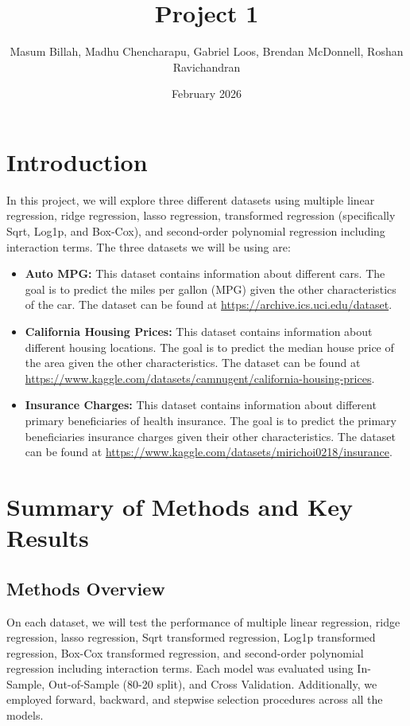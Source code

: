 \documentclass{article}
\title{Project 1}
\author{Masum Billah, Madhu Chencharapu, Gabriel Loos, Brendan McDonnell, Roshan Ravichandran}
\date{February 2026}
\begin{document}
\maketitle

\section{Introduction}

In this project, we will explore three different datasets using multiple linear regression, ridge regression, lasso regression, transformed regression (specifically Sqrt, Log1p, and Box-Cox), and second-order polynomial regression including interaction terms. The three datasets we will be using are:

\begin{itemize}
	\item \textbf{Auto MPG:} This dataset contains information about different cars. The goal is to predict the miles per gallon (MPG) given the other characteristics of the car. The dataset can be found at \url{https://archive.ics.uci.edu/dataset}.
	\item \textbf{California Housing Prices:} This dataset contains information about different housing locations. The goal is to predict the median house price of the area given the other characteristics. The dataset can be found at \url{https://www.kaggle.com/datasets/camnugent/california-housing-prices}.
	\item \textbf{Insurance Charges:} This dataset contains information about different primary beneficiaries of health insurance. The goal is to predict the primary beneficiaries insurance charges given their other characteristics. The dataset can be found at \url{https://www.kaggle.com/datasets/mirichoi0218/insurance}.
\end{itemize}

\section{Summary of Methods and Key Results}

\subsection{Methods Overview}

On each dataset, we will test the performance of multiple linear regression, ridge regression, lasso regression, Sqrt transformed regression, Log1p transformed regression, Box-Cox transformed regression, and second-order polynomial regression including interaction terms. Each model was evaluated using In-Sample, Out-of-Sample (80-20 split), and Cross Validation. Additionally, we employed forward, backward, and stepwise selection procedures across all the models.
\end{document}
